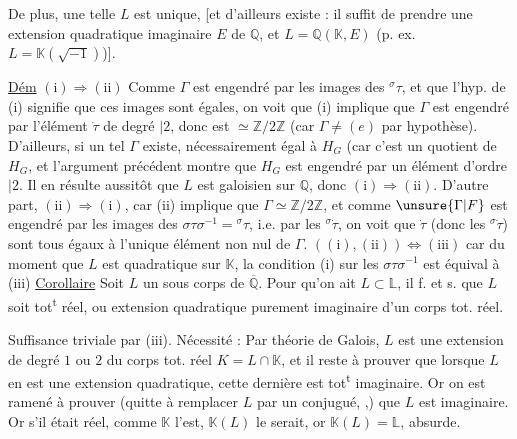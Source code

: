 De plus, une telle $L$  est unique, [et
d'ailleurs existe : il suffit de prendre une extension
quadratique imaginaire $E$ de $\mathbb Q$, et $L=\mathbb Q(\mathbb K,E)$
(p. ex. $L=\mathbb K(\sqrt{-1})$)].

\uline{Dém} $\mathrm{(i)}\Rightarrow\mathrm{(ii)}$ Comme $\Gamma$ est engendré par les images
\deleted{$\unsure{{}^\sigma\dot\tau}$} des $ {}^\sigma\tau$,  et que l'hyp. de (i) signifie que
ces images sont égales, on voit que (i) implique que
$\Gamma$ est engendré par l'élément $\dot\tau$ de degré $\mid 2$, donc est
$\simeq\mathbb Z/2\mathbb Z$ (car $\Gamma\ne(e)$ par hypothèse). D'ailleurs, si un
tel $\Gamma$ existe,   nécessairement égal à $H_G$ (car 
c'est un quotient de $H_G$, et l'argument précédent montre
que  $H_G$ est engendré par un élément d'ordre $\mid2$. 
 Il en résulte aussitôt que $L$ est galoisien
sur $\mathbb Q$, donc $\mathrm{(i)}\Rightarrow\mathrm{(ii)}$. D'autre part, $\mathrm{(ii)}\Rightarrow\mathrm{(i)}$, car
(ii) implique que $\Gamma\simeq\mathbb Z/2\mathbb Z$, et comme $\unsure{\Gamma|F}$ est engendré par les
images des $\sigma\tau\sigma^{-1}={}^{\sigma}\tau$, i.e. par les $ {}^\sigma\dot\tau$, on voit que
$\dot\tau$ (donc les $ {}^\sigma\dot\tau$) sont tous égaux à l'unique élément non nul de $\Gamma$.
$(\mathrm{(i)},\mathrm{(ii)})\Longleftrightarrow\mathrm{(iii)}$ car du moment que $L$ est quadratique sur $\mathbb K$,
la condition (i) sur les $\sigma\tau\sigma^{-1}$ est  équival à (iii)
\uline{Corollaire} Soit $L$ un sous corps de $\overline{\mathbb Q}$. Pour qu'on ait
$L\subset\mathbb L$, il f. et s. que $L$ soit tot\textsuperscript{t} réel, ou extension
quadratique purement imaginaire d'un corps tot. réel.

Suffisance triviale par (iii). Nécessité : Par théorie
de Galois, $L$ est une extension de degré $1$ ou $2$
du corps tot. réel $K=L\cap\mathbb K$, et il reste à
prouver que lorsque $L$ en est une extension
quadratique, cette dernière est tot\textsuperscript{t} imaginaire.
 Or  on est ramené à prouver
(quitte à remplacer $L$ par un conjugué, ,) que $L$ est
imaginaire. Or s'il était réel, comme $\mathbb K$ l'est, $\mathbb K(L)$ le
serait, or $\mathbb K(L)=\mathbb L$, absurde.

